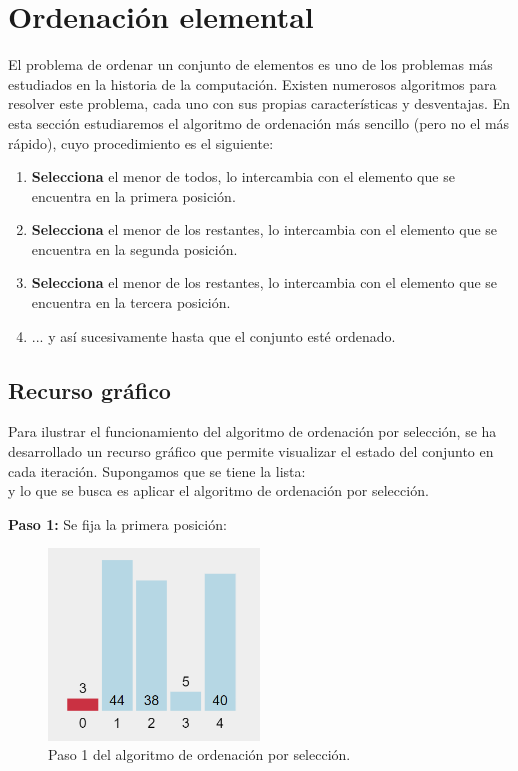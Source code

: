 \section{Ordenación elemental}
El problema de ordenar un conjunto de elementos es uno de los problemas más estudiados en la historia de la computación. Existen numerosos algoritmos para resolver este problema, cada uno con sus propias características y desventajas. En esta sección estudiaremos el algoritmo de ordenación más sencillo (pero no el más rápido), cuyo procedimiento es el siguiente:

\begin{enumerate}
    \item \textbf{Selecciona} el menor de todos, lo intercambia con el elemento que se encuentra en la primera posición.
    \item \textbf{Selecciona} el menor de los restantes, lo intercambia con el elemento que se encuentra en la segunda posición. 
    \item \textbf{Selecciona} el menor de los restantes, lo intercambia con el elemento que se encuentra en la tercera posición. 
    \item ... y así sucesivamente hasta que el conjunto esté ordenado.  
\end{enumerate}
\newpage
\subsection{Recurso gráfico}
Para ilustrar el funcionamiento del algoritmo de ordenación por selección, se ha desarrollado un recurso gráfico que permite visualizar el estado del conjunto en cada iteración. Supongamos que se tiene la lista:
\begin{equation*}
    [ \ 3,44,38,5,40 \ ]
\end{equation*}
y lo que se busca es aplicar el algoritmo de ordenación por selección.

\textbf{Paso 1:} Se fija la primera posición:

\begin{figure}[h!]  
    \centering
    \includegraphics[width=0.5\textwidth]{./Images/oe1.png}
    \caption{Paso 1 del algoritmo de ordenación por selección.}
    \label{fig:SelectionSort1}
\end{figure}

